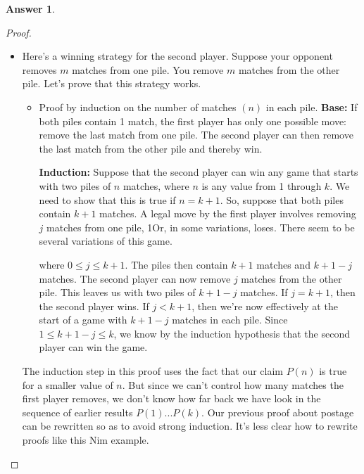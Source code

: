 \documentclass[a4paper]{article}
\renewcommand{\(}{\left(}
\renewcommand{\)}{\right)}
\theoremstyle{plain}
\theoremstyle{plain}
\theoremstyle{definition}
\newtheorem*{answer}{Answer}
\begin{document}
\begin{shaded}
\begin{answer}
\begin{proof}
$$$$

\begin{itemize}
 \item[] {Here's a winning strategy for the second player. Suppose your opponent removes $m$ matches from one pile. You remove $m$ matches from the other pile. Let's prove that this strategy works.
\begin{itemize}

\item[] {Proof by induction on the number of matches $(n)$ in each pile.
\textbf{Base:} If both piles contain 1 match, the first player has only one possible move: remove the last match from one pile. The second player can then remove the last match from the other pile and thereby win.

\textbf{Induction:} Suppose that the second player can win any game that starts with two piles of $n$ matches, where $n$ is any value from 1 through $k$. We need to show that this is true if $n = k + 1$. So, suppose that both piles contain $k + 1$ matches. A legal move by the first player involves removing $j$ matches from one pile, 1Or, in some variations, loses. There seem to be several variations of this game.

where $0 \leq j \leq k + 1$. The piles then contain $k + 1$ matches and $k + 1 − j$ matches. The second player can now remove $j$ matches from the other pile. This leaves us with two piles of $k+1−j$ matches. If $j = k+1$, then the second player wins. If $j < k + 1$, then we're now effectively at the start of a game with $k + 1 − j$ matches in each pile. Since $1 \leq k +1−j \leq k$, we know by the induction hypothesis that the second player can win the game.}
\end{itemize}

The induction step in this proof uses the fact that our claim $P(n)$ is true for a smaller value of $n$. But since we can't control how many matches the first player removes, we don't know how far back we have look in the sequence of earlier results $P(1) . . .P(k)$. Our previous proof about postage can be rewritten so as to avoid strong induction. It's less clear how to rewrite proofs like this Nim example.}
\end{itemize}
\end{proof}
\end{answer}
\end{shaded}
\end{document}
